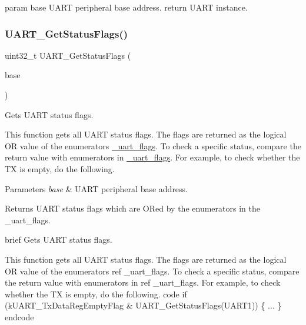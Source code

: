 param base U\+A\+RT peripheral base address. return U\+A\+RT instance. \mbox{\label{group__uart__driver_ga28bf715678c0d3c8c3902e79455ee923}} 
\subsubsection{\texorpdfstring{UART\_GetStatusFlags()}{UART\_GetStatusFlags()}}
{\footnotesize\ttfamily uint32\+\_\+t U\+A\+R\+T\+\_\+\+Get\+Status\+Flags (\begin{DoxyParamCaption}\item[{\mbox{\hyperlink{struct_u_a_r_t___type}{U\+A\+R\+T\+\_\+\+Type}} $\ast$}]{base }\end{DoxyParamCaption})}



Gets U\+A\+RT status flags. 

This function gets all U\+A\+RT status flags. The flags are returned as the logical OR value of the enumerators \mbox{\hyperlink{group__uart__driver_ga259a53f363288115306a45d08fc66eb8}{\+\_\+uart\+\_\+flags}}. To check a specific status, compare the return value with enumerators in \mbox{\hyperlink{group__uart__driver_ga259a53f363288115306a45d08fc66eb8}{\+\_\+uart\+\_\+flags}}. For example, to check whether the TX is empty, do the following. 
\begin{DoxyCode}{0}
\DoxyCodeLine{\{}
\DoxyCodeLine{\}}
\end{DoxyCode}



\begin{DoxyParams}{Parameters}
{\em base} & U\+A\+RT peripheral base address. \\
\hline
\end{DoxyParams}
\begin{DoxyReturn}{Returns}
U\+A\+RT status flags which are O\+Red by the enumerators in the \+\_\+uart\+\_\+flags.
\end{DoxyReturn}
brief Gets U\+A\+RT status flags.

This function gets all U\+A\+RT status flags. The flags are returned as the logical OR value of the enumerators ref \+\_\+uart\+\_\+flags. To check a specific status, compare the return value with enumerators in ref \+\_\+uart\+\_\+flags. For example, to check whether the TX is empty, do the following. code if (k\+U\+A\+R\+T\+\_\+\+Tx\+Data\+Reg\+Empty\+Flag \& U\+A\+R\+T\+\_\+\+Get\+Status\+Flags(\+U\+A\+R\+T1)) \{ ... \} endcode

